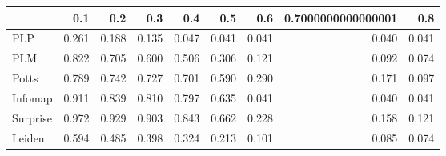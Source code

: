 \begin{tabular}{lrrrrrrrr}
\toprule
{} &   0.1 &   0.2 &   0.3 &   0.4 &   0.5 &   0.6 & 0.7000000000000001 &   0.8 \\
\midrule
PLP      & 0.261 & 0.188 & 0.135 & 0.047 & 0.041 & 0.041 &              0.040 & 0.041 \\
PLM      & 0.822 & 0.705 & 0.600 & 0.506 & 0.306 & 0.121 &              0.092 & 0.074 \\
Potts    & 0.789 & 0.742 & 0.727 & 0.701 & 0.590 & 0.290 &              0.171 & 0.097 \\
Infomap  & 0.911 & 0.839 & 0.810 & 0.797 & 0.635 & 0.041 &              0.040 & 0.041 \\
Surprise & 0.972 & 0.929 & 0.903 & 0.843 & 0.662 & 0.228 &              0.158 & 0.121 \\
Leiden   & 0.594 & 0.485 & 0.398 & 0.324 & 0.213 & 0.101 &              0.085 & 0.074 \\
\bottomrule
\end{tabular}
